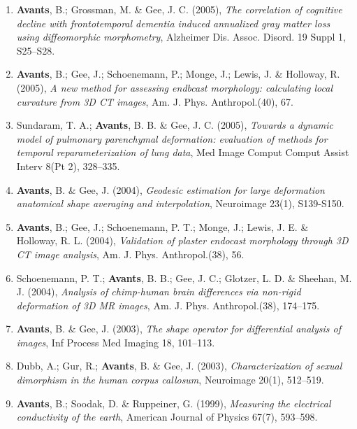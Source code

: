 \documentclass[11pt]{moderncv} %
\begin{document}
\begin{enumerate}
\item  \textbf{Avants}, B.; Grossman, M. \&  Gee, J. C. (2005), \textit{The correlation of cognitive decline with frontotemporal dementia induced annualized gray matter loss using diffeomorphic morphometry}, Alzheimer Dis. Assoc. Disord. 19 Suppl 1, S25--S28.

\item  \textbf{Avants}, B.; Gee, J.; Schoenemann, P.; Monge, J.; Lewis, J. \&  Holloway, R. (2005), \textit{A new method for assessing endbcast morphology: calculating local curvature from 3D CT images}, Am. J. Phys. Anthropol.(40), 67.

\item  Sundaram, T. A.; \textbf{Avants}, B. B. \&  Gee, J. C. (2005), \textit{Towards a dynamic model of pulmonary parenchymal deformation: evaluation of methods for temporal reparameterization of lung data}, Med Image Comput Comput Assist Interv 8(Pt 2), 328--335.

\item  \textbf{Avants}, B. \&  Gee, J. (2004), \textit{Geodesic estimation for large deformation anatomical shape averaging and interpolation}, Neuroimage 23(1), S139-S150.

\item  \textbf{Avants}, B.; Gee, J.; Schoenemann, P. T.; Monge, J.; Lewis, J. E. \&  Holloway, R. L. (2004), \textit{Validation of plaster endocast morphology through 3D CT image analysis}, Am. J. Phys. Anthropol.(38), 56.

\item  Schoenemann, P. T.; \textbf{Avants}, B. B.; Gee, J. C.; Glotzer, L. D. \&  Sheehan, M. J. (2004), \textit{Analysis of chimp-human brain differences via non-rigid deformation of 3D MR images}, Am. J. Phys. Anthropol.(38), 174--175.

\item  \textbf{Avants}, B. \&  Gee, J. (2003), \textit{The shape operator for differential analysis of images}, Inf Process Med Imaging 18, 101--113.

\item  Dubb, A.; Gur, R.; \textbf{Avants}, B. \&  Gee, J. (2003), \textit{Characterization of sexual dimorphism in the human corpus callosum}, Neuroimage 20(1), 512--519.

\item  \textbf{Avants}, B.; Soodak, D. \&  Ruppeiner, G. (1999), \textit{Measuring the electrical conductivity of the earth}, American Journal of Physics 67(7), 593--598.
\end{enumerate}
\end{document}
